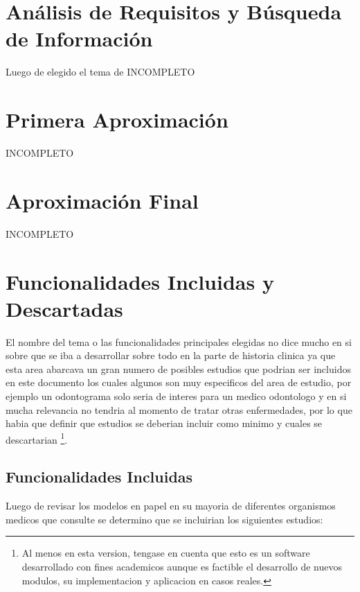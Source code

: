 \section{Análisis de Requisitos y Búsqueda de Información}

Luego de elegido el tema de
INCOMPLETO

\section{Primera Aproximación}

INCOMPLETO

\section{Aproximación Final}

INCOMPLETO

\section{Funcionalidades Incluidas y Descartadas}

El nombre del tema o las funcionalidades principales elegidas no dice mucho en 
si sobre que se iba a desarrollar sobre todo en la parte de historia clinica 
ya que esta area abarcava un gran numero de posibles estudios que podrian ser 
incluidos en este documento los cuales algunos son muy especificos del area
de estudio, por ejemplo un odontograma solo seria de interes para un medico
odontologo y en si mucha relevancia no tendria al momento de tratar otras 
enfermedades, por lo que habia que definir que estudios se deberian incluir 
como minimo y cuales se descartarian \footnote{Al menos en esta version, tengase en cuenta que 
esto es un software desarrollado con fines academicos aunque es factible el 
desarrollo de nuevos modulos, su implementacion y aplicacion en casos reales.}.


\subsection{Funcionalidades Incluidas}

Luego de revisar los modelos en papel en su mayoria de diferentes organismos
medicos que consulte se determino que se incluirian los siguientes estudios:

